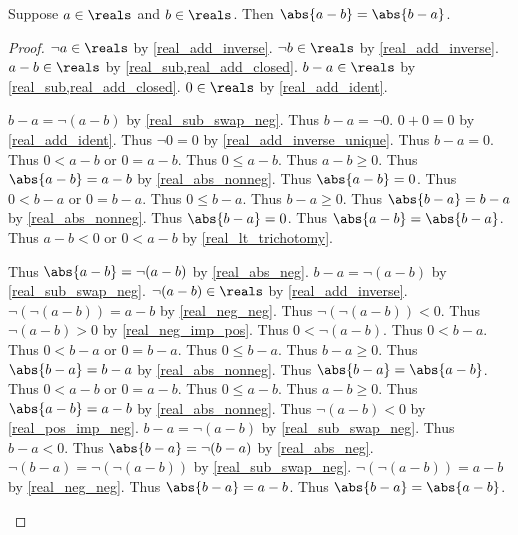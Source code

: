 \begin{theorem}\label{real_abs_sub_swap}
    Suppose $a\in\reals$ and $b\in\reals$.
    Then $\abs{a - b} = \abs{b - a}$.
\end{theorem}
\begin{proof}
    $\neg{a}\in\reals$ by \cref{real_add_inverse}.
    $\neg{b}\in\reals$ by \cref{real_add_inverse}.
    $a - b\in\reals$ by \cref{real_sub,real_add_closed}.
    $b - a\in\reals$ by \cref{real_sub,real_add_closed}.
    $0\in\reals$ by \cref{real_add_ident}.
    \begin{byCase}
        $b - a = \neg{(a - b)}$ by \cref{real_sub_swap_neg}.
        Thus $b - a = \neg{0}$.
        $0 + 0 = 0$ by \cref{real_add_ident}.
        Thus $\neg{0} = 0$ by \cref{real_add_inverse_unique}.
        Thus $b - a = 0$.
        Thus $0 < a - b$ or $0 = a - b$.
        Thus $0 \leq a - b$.
        Thus $a - b \geq 0$.
        Thus $\abs{a - b} = a - b$ by \cref{real_abs_nonneg}.
        Thus $\abs{a - b} = 0$.
        Thus $0 < b - a$ or $0 = b - a$.
        Thus $0 \leq b - a$.
        Thus $b - a \geq 0$.
        Thus $\abs{b - a} = b - a$ by \cref{real_abs_nonneg}.
        Thus $\abs{b - a} = 0$.
        Thus $\abs{a - b} = \abs{b - a}$.
        Thus $a - b < 0$ or $0 < a - b$ by \cref{real_lt_trichotomy}.
        \begin{byCase}
            Thus $\abs{a - b} = \neg{(a - b)}$ by \cref{real_abs_neg}.
            $b - a = \neg{(a - b)}$ by \cref{real_sub_swap_neg}.
            $\neg{(a - b)}\in\reals$ by \cref{real_add_inverse}.
            $\neg{(\neg{(a - b)})} = a - b$ by \cref{real_neg_neg}.
            Thus $\neg{(\neg{(a - b)})} < 0$.
            Thus $\neg{(a - b)} > 0$ by \cref{real_neg_imp_pos}.
            Thus $0 < \neg{(a - b)}$.
            Thus $0 < b - a$.
            Thus $0 < b - a$ or $0 = b - a$.
            Thus $0 \leq b - a$.
            Thus $b - a \geq 0$.
            Thus $\abs{b - a} = b - a$ by \cref{real_abs_nonneg}.
            Thus $\abs{b - a} = \abs{a - b}$.
            Thus $0 < a - b$ or $0 = a - b$.
            Thus $0 \leq a - b$.
            Thus $a - b \geq 0$.
            Thus $\abs{a - b} = a - b$ by \cref{real_abs_nonneg}.
            Thus $\neg{(a - b)} < 0$ by \cref{real_pos_imp_neg}.
            $b - a = \neg{(a - b)}$ by \cref{real_sub_swap_neg}.
            Thus $b - a < 0$.
            Thus $\abs{b - a} = \neg{(b - a)}$ by \cref{real_abs_neg}.
            $\neg{(b - a)} = \neg{(\neg{(a - b)})}$ by \cref{real_sub_swap_neg}.
            $\neg{(\neg{(a - b)})} = a - b$ by \cref{real_neg_neg}.
            Thus $\abs{b - a} = a - b$.
            Thus $\abs{b - a} = \abs{a - b}$.
        \end{byCase}
    \end{byCase}
\end{proof}


